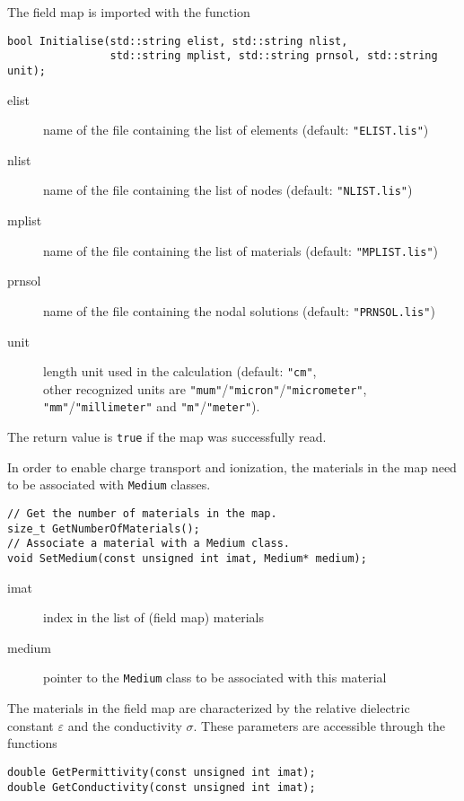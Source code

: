 The field map is imported with the function
\begin{lstlisting}
bool Initialise(std::string elist, std::string nlist,
                std::string mplist, std::string prnsol, std::string unit);
\end{lstlisting}
\begin{description}
  \item[elist]
  name of the file containing the list of elements 
  (default: \texttt{"ELIST.lis"})
  \item[nlist]
  name of the file containing the list of nodes
  (default: \texttt{"NLIST.lis"})
  \item[mplist]
  name of the file containing the list of materials
  (default: \texttt{"MPLIST.lis"})
  \item[prnsol]
  name of the file containing the nodal solutions
  (default: \texttt{"PRNSOL.lis"})
  \item[unit]
  length unit used in the calculation (default: \texttt{"cm"}, \\ 
  other recognized units are 
  \texttt{"mum"}/\texttt{"micron"}/\texttt{"micrometer"},
  \texttt{"mm"}/\texttt{"millimeter"} and 
  \texttt{"m"}/\texttt{"meter"}).
\end{description}
The return value is \texttt{true} if the map was successfully read. 

In order to enable charge transport and ionization,
the materials in the map need to be associated with \texttt{Medium} classes.
\begin{lstlisting}
// Get the number of materials in the map.
size_t GetNumberOfMaterials();
// Associate a material with a Medium class.
void SetMedium(const unsigned int imat, Medium* medium);
\end{lstlisting}
\begin{description}
\item[imat]
index in the list of (field map) materials
\item[medium]
pointer to the \texttt{Medium} class to be associated with this material
\end{description}

The materials in the field map are characterized by the 
relative dielectric constant \(\varepsilon\) and the 
conductivity \(\sigma\). 
These parameters are accessible through the functions
\begin{lstlisting}
double GetPermittivity(const unsigned int imat);
double GetConductivity(const unsigned int imat);
\end{lstlisting}

